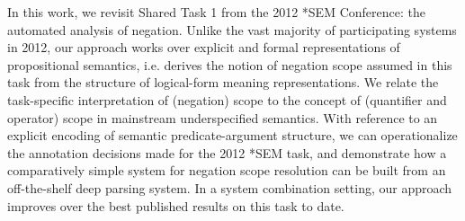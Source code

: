 In this work, we revisit Shared Task 1 from the 2012 *SEM Conference: the automated analysis of negation. Unlike the vast majority of participating systems in 2012, our approach works over explicit and formal representations of propositional semantics, i.e. derives the notion of negation scope assumed in this task from the structure of logical-form meaning representations. We relate the task-specific interpretation of (negation) scope to the concept of (quantifier and operator) scope in mainstream underspecified semantics. With reference to an explicit encoding of semantic predicate-argument structure, we can operationalize the annotation decisions made for the 2012 *SEM task, and demonstrate how a comparatively simple system for negation scope resolution can be built from an off-the-shelf deep parsing system. In a system combination setting, our approach improves over the best published results on this task to date.
